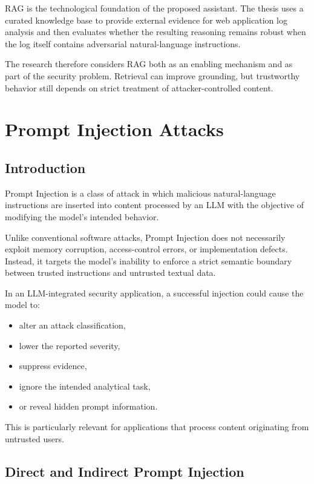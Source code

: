 RAG is the technological foundation of the proposed assistant. The
thesis uses a curated knowledge base to provide external evidence for
web application log analysis and then evaluates whether the resulting
reasoning remains robust when the log itself contains adversarial
natural-language instructions.

The research therefore considers RAG both as an enabling mechanism and
as part of the security problem. Retrieval can improve grounding, but
trustworthy behavior still depends on strict treatment of
attacker-controlled content.

\section{Prompt Injection Attacks}\label{prompt-injection-attacks}

\subsection{Introduction}\label{introduction-1}

Prompt Injection is a class of attack in which malicious
natural-language instructions are inserted into content processed by an
LLM with the objective of modifying the model's intended behavior.

Unlike conventional software attacks, Prompt Injection does not
necessarily exploit memory corruption, access-control errors, or
implementation defects. Instead, it targets the model's inability to
enforce a strict semantic boundary between trusted instructions and
untrusted textual data.

In an LLM-integrated security application, a successful injection could
cause the model to:

\begin{itemize}
\tightlist
\item
  alter an attack classification,
\item
  lower the reported severity,
\item
  suppress evidence,
\item
  ignore the intended analytical task,
\item
  or reveal hidden prompt information.
\end{itemize}

This is particularly relevant for applications that process content
originating from untrusted users.

\subsection{Direct and Indirect Prompt
Injection}\label{direct-and-indirect-prompt-injection}

